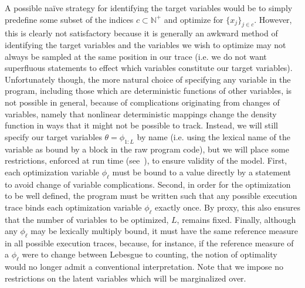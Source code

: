 A possible na\"{i}ve strategy for identifying the target variables
would be to simply predefine some subset of the \sample indices
$c \subset \mathbb{N}^+$ and optimize for $\{x_j \}_{j\in c}$.  However, this is clearly not satisfactory
because it is generally an awkward method of identifying the target variables and the variables we wish
to optimize may not always be sampled at the same position in our trace (i.e. we do not want superfluous
\sample statements to effect which variables constitute our target variables).
Unfortunately though, the more natural choice of specifying any variable in the program, including those
which are deterministic functions of other variables, is not possible in general, because of complications
originating from changes of variables, namely that nonlinear deterministic mappings change the density
function in ways that it might not be possible to track.  Instead, we will still specify our target variables
$\theta = \phi_{1:L}$ by name (i.e. using the lexical name of the variable as bound by a  block in
the raw program code), but we will place some restrictions, enforced at run time (see~\cite{rainforth2016nips}), 
to ensure validity of the model.  First, each optimization variable $\phi_{\ell}$ must be bound to a value directly 
by a \sample statement to avoid change of variable complications.
Second, in order for the optimization to be well defined, the program must be written such that any 
possible execution trace binds each optimization variable $\phi_{\ell}$ exactly once.  By proxy, this also
ensures that the number of variables to be optimized, $L$, remains fixed.
Finally, although any $\phi_{\ell}$ may be lexically multiply bound, it must have the same reference 
measure in all possible execution traces, because, for instance, if the reference measure of 
a $\phi_{\ell}$ were to change between Lebesgue to counting, the notion of optimality would 
no longer admit a conventional interpretation.  Note that we impose no restrictions on the latent
variables which will be marginalized over.

